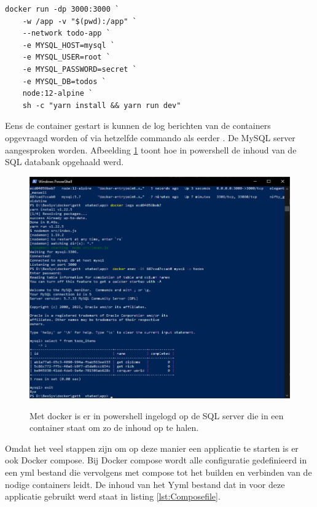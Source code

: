 \begin{lstlisting}
docker run -dp 3000:3000 `
    -w /app -v "$(pwd):/app" `
    --network todo-app `
    -e MYSQL_HOST=mysql `
    -e MYSQL_USER=root `
    -e MYSQL_PASSWORD=secret `
    -e MYSQL_DB=todos `
    node:12-alpine `
    sh -c "yarn install && yarn run dev"
\end{lstlisting}
Eens de container gestart is kunnen de log berichten van de containers opgevraagd worden of via hetzelfde commando als eerder . De MySQL server aangesproken worden. Afbeelding \ref{fig:powershellsql} toont hoe in powershell de inhoud van de SQL databank opgehaald werd.
\begin{figure}[h]
    \includegraphics[width=\linewidth]{img/sqlquery.png}
    \label{fig:powershellsql}
    \caption[Het aanspreken van een SQL server binnen een container]{Met docker is er in powershell ingelogd op de SQL server die in een container staat om zo de inhoud op te halen.}
    \centering
\end{figure}

Omdat het veel stappen zijn om op deze manier een applicatie te starten is er ook Docker compose. Bij Docker compose wordt alle configuratie gedefinieerd in een yml bestand die vervolgens met compose tot het builden en verbinden van de nodige containers leidt. De inhoud van het Yyml bestand dat in voor deze applicatie gebruikt werd staat in listing \ref{lst:Composefile}.

